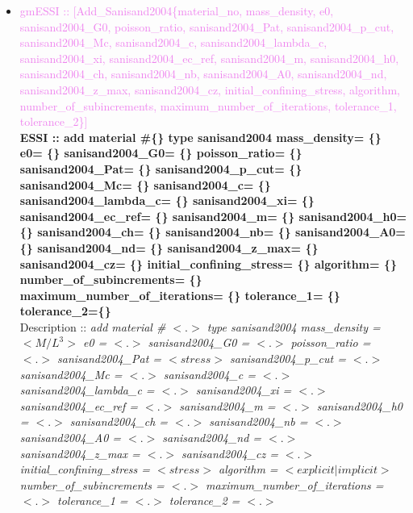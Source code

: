 \documentclass[11pt]{article}
\begin{document}
\begin{itemize}
      \item \textcolor{violet}{gmESSI :: [Add\_Sanisand2004\{material\_no, mass\_density, e0, sanisand2004\_G0, poisson\_ratio, sanisand2004\_Pat, sanisand2004\_p\_cut, sanisand2004\_Mc, sanisand2004\_c, sanisand2004\_lambda\_c, sanisand2004\_xi, sanisand2004\_ec\_ref, sanisand2004\_m, sanisand2004\_h0, sanisand2004\_ch, sanisand2004\_nb, sanisand2004\_A0, sanisand2004\_nd, sanisand2004\_z\_max, sanisand2004\_cz, initial\_confining\_stress, algorithm, number\_of\_subincrements, maximum\_number\_of\_iterations, tolerance\_1, tolerance\_2\}]}\\
      \textbf{ESSI :: add material \#\{\} type sanisand2004 mass\_density= \{\} e0= \{\} sanisand2004\_G0= \{\} poisson\_ratio= \{\} sanisand2004\_Pat= \{\}  sanisand2004\_p\_cut= \{\}  sanisand2004\_Mc= \{\}  sanisand2004\_c= \{\} sanisand2004\_lambda\_c= \{\} sanisand2004\_xi= \{\}  sanisand2004\_ec\_ref= \{\}  sanisand2004\_m= \{\}  sanisand2004\_h0= \{\} sanisand2004\_ch= \{\}  sanisand2004\_nb= \{\} sanisand2004\_A0= \{\} sanisand2004\_nd= \{\} sanisand2004\_z\_max= \{\}  sanisand2004\_cz= \{\} initial\_confining\_stress= \{\}  algorithm= \{\}  number\_of\_subincrements= \{\}  maximum\_number\_of\_iterations= \{\}  tolerance\_1= \{\}  tolerance\_2=\{\} }\\
      Description ::  \textit{ add material \# $<.>$ type sanisand2004 mass\_density = $<M/L^3>$ e0 = $<.>$ sanisand2004\_G0 = $<.>$ poisson\_ratio = $<.>$ sanisand2004\_Pat = $<stress>$  sanisand2004\_p\_cut = $<.>$  sanisand2004\_Mc = $<.>$  sanisand2004\_c = $<.>$ sanisand2004\_lambda\_c = $<.>$ sanisand2004\_xi = $<.>$  sanisand2004\_ec\_ref = $<.>$  sanisand2004\_m = $<.>$  sanisand2004\_h0 = $<.>$ sanisand2004\_ch = $<.>$  sanisand2004\_nb = $<.>$ sanisand2004\_A0 = $<.>$ sanisand2004\_nd = $<.>$ sanisand2004\_z\_max = $<.>$  sanisand2004\_cz = $<.>$ initial\_confining\_stress = $<stress>$  algorithm = $<explicit|implicit>$  number\_of\_subincrements = $<.>$  maximum\_number\_of\_iterations = $<.>$  tolerance\_1 = $<.>$  tolerance\_2 = $<.>$} 


\end{itemize}
\end{document}
